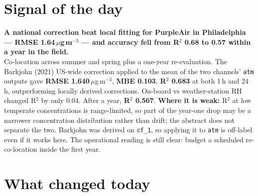 \documentclass[10pt]{article}
\begin{document}
\vspace{6mm}

\section*{\sffamily\bfseries\color{Deep}Signal of the day}
\vspace{-1.5mm}{\color{Amber}\rule{\linewidth}{1.1pt}}\vspace{2.5mm}

\begin{keybox}
{\sffamily\bfseries\small\color{Deep}A national correction beat local fitting for PurpleAir in
Philadelphia --- RMSE 1.64\,$\mu$g\,m$^{-3}$ --- and accuracy fell from R$^2$ 0.68 to 0.57 within a year in the
field.}\\[1.4mm]
\footnotesize
Co-location across summer and spring plus a one-year re-evaluation. The Barkjohn (2021) US-wide correction
applied to the mean of the two channels' \texttt{atm} outputs gave \textbf{RMSE 1.640}\,$\mu$g\,m$^{-3}$,
\textbf{MBE 0.103}, \textbf{R$^2$ 0.683} at both 1\,h and 24\,h, outperforming locally derived corrections. On-board
vs weather-station RH changed R$^2$ by only 0.04. After a year, \textbf{R$^2$ 0.567}.
\textbf{Where it is weak:} R$^2$ at low temperate concentrations is range-limited, so part of the year-one drop may
be a narrower concentration distribution rather than drift; the abstract does not separate the two. Barkjohn was
derived on \texttt{cf\_1}, so applying it to \texttt{atm} is off-label even if it works here. The operational
reading is still clear: budget a scheduled re-co-location inside the first year.\par
\end{keybox}

\vspace{3mm}

\section*{\sffamily\bfseries\color{Deep}What changed today}
\vspace{-1.5mm}{\color{Amber}\rule{\linewidth}{1.1pt}}\vspace{2.5mm}
\end{document}
